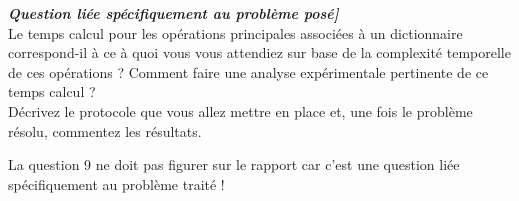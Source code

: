 \textit{\textbf{Question liée spécifiquement au problème posé]}} \\
Le temps calcul pour les opérations principales associées à un dictionnaire correspond-il à ce à quoi vous vous attendiez sur 
base de la complexité temporelle de ces opérations ? Comment faire une analyse expérimentale pertinente de ce temps calcul ? \\
Décrivez le protocole que vous allez mettre en place et, une fois le problème résolu, commentez les résultats.

La question 9 ne doit pas figurer sur le rapport car c'est une question liée spécifiquement au problème traité !

